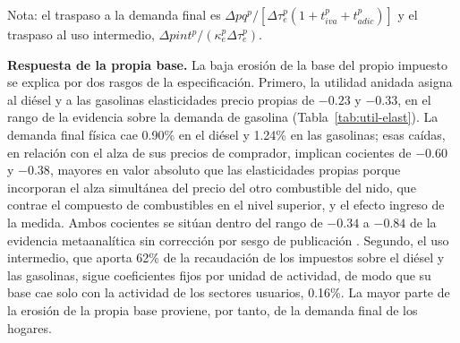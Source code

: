 \documentclass[11pt]{article}
\begin{document}
\begin{table}[H]
\centering
\caption{Traspaso a precios y variación de las bases físicas en el aumento de los impuestos específicos a los combustibles}
\label{tab:tesp-traspaso}
\small
{}
\par\smallskip
\begin{minipage}{\textwidth}
\footnotesize Nota: el traspaso a la demanda final es $\Delta pq^{p}/\left[\Delta\tau_{e}^{p}\left(1+t_{iva}^{p}+t_{adic}^{p}\right)\right]$ y el traspaso al uso intermedio, $\Delta pint^{p}/\left(\kappa_{e}^{p}\Delta\tau_{e}^{p}\right)$.
\end{minipage}
\end{table}

\textbf{Respuesta de la propia base.} La baja erosión de la base del propio impuesto se explica por dos rasgos de la especificación. Primero, la utilidad anidada asigna al diésel y a las gasolinas elasticidades precio propias de $-0.23$ y $-0.33$, en el rango de la evidencia sobre la demanda de gasolina (Tabla~\ref{tab:util-elast}). La demanda final física cae 0.90\% en el diésel y 1.24\% en las gasolinas; esas caídas, en relación con el alza de sus precios de comprador, implican cocientes de $-0.60$ y $-0.38$, mayores en valor absoluto que las elasticidades propias porque incorporan el alza simultánea del precio del otro combustible del nido, que contrae el compuesto de combustibles en el nivel superior, y el efecto ingreso de la medida. Ambos cocientes se sitúan dentro del rango de $-0.34$ a $-0.84$ de la evidencia metaanalítica sin corrección por sesgo de publicación \cite{brons_etal_2008}. Segundo, el uso intermedio, que aporta 62\% de la recaudación de los impuestos sobre el diésel y las gasolinas, sigue coeficientes fijos por unidad de actividad, de modo que su base cae solo con la actividad de los sectores usuarios, 0.16\%. La mayor parte de la erosión de la propia base proviene, por tanto, de la demanda final de los hogares.
\end{document}

